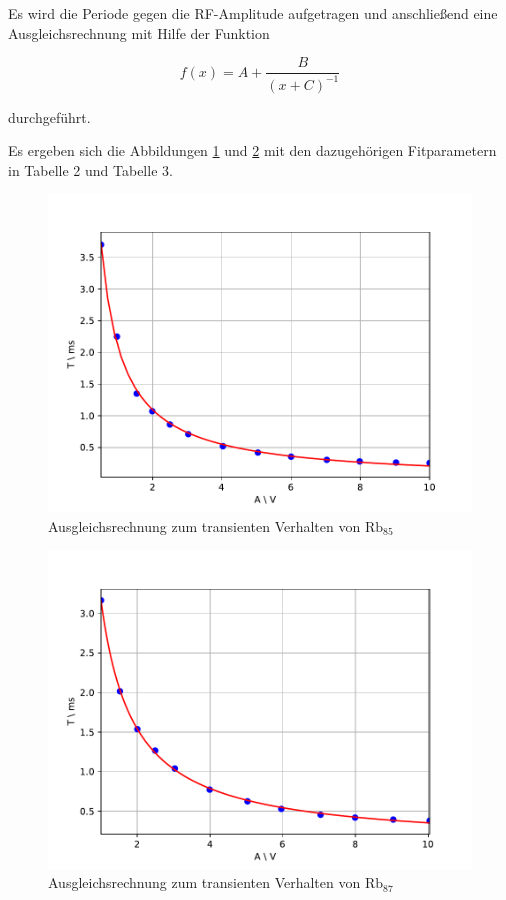 Es wird die Periode gegen die RF-Amplitude aufgetragen und anschließend eine Ausgleichsrechnung mit Hilfe der Funktion

\begin{equation}
f(x) = A + \frac{B}{(x+C)^{-1}}
\end{equation}

durchgeführt.

Es ergeben sich die Abbildungen \ref{trans1} und \ref{trans2} mit den dazugehörigen Fitparametern in Tabelle 2 und Tabelle 3.

\begin{figure}[h]
\centering
\includegraphics[scale=0.8]{img/trans1.pdf}
\caption{Ausgleichsrechnung zum transienten Verhalten von $\text{Rb}_{85}$}
\label{trans1}
\end{figure}

\begin{figure}[h]
\centering
\includegraphics[scale=0.8]{img/trans2.pdf}
\caption{Ausgleichsrechnung zum transienten Verhalten von $\text{Rb}_{87}$}
\label{trans2}
\end{figure}

